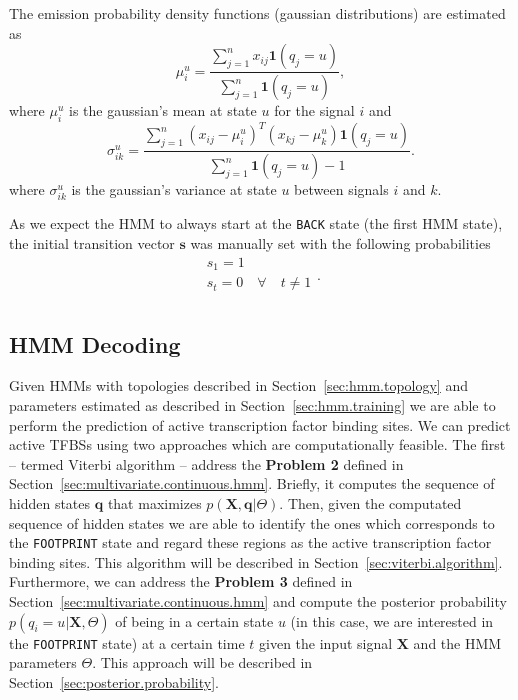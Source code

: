 The emission probability density functions (gaussian distributions) are estimated as
\begin{equation}
  \label{eq:hmm.train.e.1}
  \mu^{u}_{i} = \frac{ \sum_{j=1}^{n} {x}_{ij} {\mathbf{1}}(q_j=u) }{ \sum_{j=1}^{n} {\mathbf{1}} (q_j=u) },
\end{equation}
where $ \mu^{u}_{i} $ is the gaussian's mean at state $u$ for the signal $i$ and
\begin{equation}
  \label{eq:hmm.train.e.2}
  {\sigma}^{u}_{ik} = \frac{\sum_{j=1}^{n} ({x}_{ij} - \mu^{u}_{i})^T({x}_{kj} - \mu^{u}_{k}) {\mathbf{1}} (q_j=u)}
  {\sum_{j=1}^{n} {\mathbf{1}} (q_j=u) - 1}.
\end{equation}
where $ \sigma^{u}_{ik} $ is the gaussian's variance at state $u$ between signals $i$ and $k$.

As we expect the HMM to always start at the {\tt BACK} state (the first HMM state), the initial transition vector $\mathbf{s}$ was manually set with the following probabilities
\begin{equation}
  \label{eq:hmm.train.s}
  \begin{array}{lcl}
    s_1 = 1 \\
    s_t = 0 \quad \forall \quad t \neq 1 \\
  \end{array}.
\end{equation}

\subsection{HMM Decoding}
\label{sec:hmm.decoding}

Given HMMs with topologies described in Section~\ref{sec:hmm.topology} and parameters estimated as described in Section~\ref{sec:hmm.training} we are able to perform the prediction of active transcription factor binding sites. We can predict active TFBSs using two approaches which are computationally feasible. The first -- termed Viterbi algorithm -- address the {\bf Problem 2} defined in Section~\ref{sec:multivariate.continuous.hmm}. Briefly, it computes the sequence of hidden states $ \mathbf{q} $ that maximizes $ p\left( \mathbf{X}, \mathbf{q} | \Theta \right) $. Then, given the computated sequence of hidden states we are able to identify the ones which corresponds to the {\tt FOOTPRINT} state and regard these regions as the active transcription factor binding sites. This algorithm will be described in Section~\ref{sec:viterbi.algorithm}. Furthermore, we can address the {\bf Problem 3} defined in Section~\ref{sec:multivariate.continuous.hmm} and compute the posterior probability $ p(q_i = u | \mathbf{X}, \Theta) $ of being in a certain state $u$ (in this case, we are interested in the {\tt FOOTPRINT} state) at a certain time $t$ given the input signal $\mathbf{X}$ and the HMM parameters $\Theta$. This approach will be described in Section~\ref{sec:posterior.probability}.

